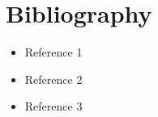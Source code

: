 \chapter*{Bibliography}
\begin{itemize}
    \item Reference 1
    \item Reference 2
    \item Reference 3
\end{itemize}
\cleardoublepage